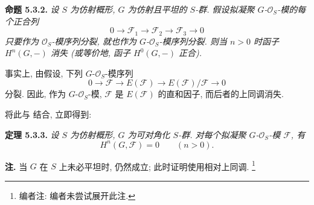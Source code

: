 \medskip
\noindent{}\textbf{命题 5.3.2.}
\textit{设 \(S\) 为仿射概形, \(G\) 为仿射且平坦的 \(S\)-群.
假设拟凝聚 \(G\)-\(\mathscr O_S\)-模的每个正合列
\[
  0\longrightarrow\mathscr F_1
   \longrightarrow\mathscr F_2
   \longrightarrow\mathscr F_3
   \longrightarrow0
\]
只要作为 \(\mathscr O_S\)-模序列分裂, 就也作为
\(G\)-\(\mathscr O_S\)-模序列分裂. 则当 \(n>0\) 时函子
\(H^n(G,-)\) 消失 (或等价地, 函子 \(H^0(G,-)\) 正合).}

事实上, 由假设, 下列 \(G\)-\(\mathscr O_S\)-模序列
\[
  0\longrightarrow\mathscr F
   \longrightarrow E(\mathscr F)
   \longrightarrow E(\mathscr F)/\mathscr F
   \longrightarrow0
\]
分裂. 因此, 作为 \(G\)-\(\mathscr O_S\)-模,
\(\mathscr F\) 是 \(E(\mathscr F)\) 的直和因子, 而后者的上同调消失.

将此与 结合, 立即得到:

\medskip
\noindent{}\textbf{定理 5.3.3.}
\textit{设 \(S\) 为仿射概形, \(G\) 为可对角化 \(S\)-群.
对每个拟凝聚 \(G\)-\(\mathscr O_S\)-模 \(\mathscr F\), 有}
\[
  H^n(G,\mathscr F)=0\qquad(n>0).
\]

\medskip
\noindent\textbf{注.}
当 \(G\) 在 \(S\) 上未必平坦时,
 仍然成立; 此时证明使用相对上同调.
\footnote{编者注: 编者未尝试展开此注.}


